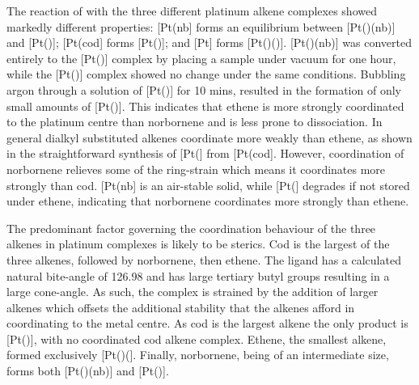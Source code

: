 The reaction of \tButhixantphos{} with the three different platinum alkene complexes showed markedly different properties:  [Pt(nb] forms an equilibrium between [Pt(\tButhixantphos)(nb)] and [Pt(\tButhixantphos)];  [Pt(cod] forms [Pt(\tButhixantphos)]; and [Pt] forms [Pt(\tButhixantphos)()]. [Pt(\tButhixantphos)(nb)] was converted entirely to the [Pt(\tButhixantphos)] complex by placing a sample under vacuum for one hour, while the [Pt(\tButhixantphos)] complex showed no change under the same conditions.  Bubbling argon through a solution of [Pt(\tButhixantphos)] for 10 mins, resulted in the formation of only small amounts of [Pt(\tButhixantphos)].  This indicates that ethene is more strongly coordinated to the platinum centre than norbornene and is less prone to dissociation.  In general dialkyl substituted alkenes coordinate more weakly than ethene, as shown in the straightforward synthesis of [Pt(] from [Pt(cod].\cite{Green1975b, Tolman1974b}  However, coordination of norbornene relieves some of the ring-strain which means it coordinates more strongly than cod.  [Pt(nb] is an air-stable solid, while [Pt(] degrades if not stored under ethene, indicating that norbornene coordinates more strongly than ethene.


The predominant factor governing the coordination behaviour of the three alkenes in \tButhixantphos{} platinum complexes is likely to be sterics.  Cod is the largest of the three alkenes, followed by norbornene, then ethene.  The \tButhixantphos{} ligand has a calculated natural bite-angle of 126.98\degrees{} and has large tertiary butyl groups resulting in a large cone-angle.  As such, the complex is strained by the addition of larger alkenes which offsets the additional stability that the alkenes afford in coordinating to the metal centre.  As cod is the largest alkene the only product is [Pt(\tButhixantphos)], with no coordinated cod alkene complex. Ethene, the smallest alkene, formed exclusively [Pt(\tButhixantphos)(].  Finally, norbornene, being of an intermediate size, forms both [Pt(\tButhixantphos)(nb)] and [Pt(\tButhixantphos)].  


